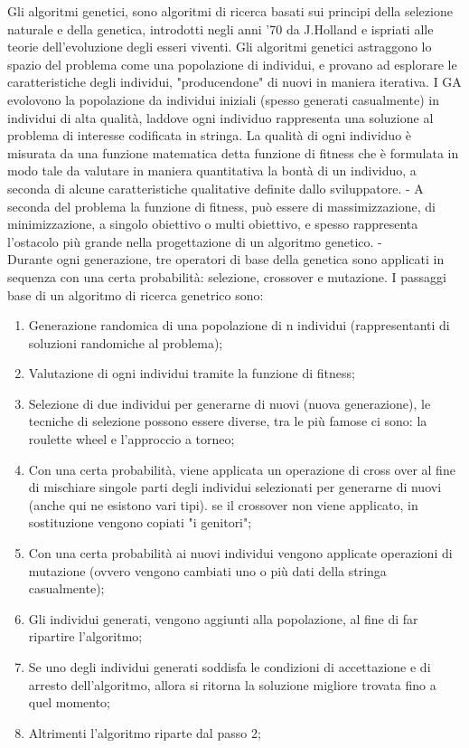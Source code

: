 \cite{geneticalgotihm}Gli algoritmi genetici, sono algoritmi di ricerca basati sui principi della selezione naturale e della genetica, introdotti negli anni '70  da J.Holland e ispriati alle teorie dell'evoluzione degli esseri viventi. Gli algoritmi genetici astraggono lo spazio del problema come una popolazione di individui, e provano ad esplorare le caratteristiche degli individui, "producendone" di nuovi in maniera iterativa. I GA evolovono la popolazione da individui iniziali (spesso generati casualmente) in individui di alta qualità, laddove ogni individuo rappresenta una soluzione al problema di interesse codificata in stringa. La qualità di ogni individuo è misurata da una funzione matematica detta funzione di fitness che è formulata in modo tale da valutare in maniera quantitativa la bontà di un individuo, a seconda di alcune caratteristiche qualitative definite dallo sviluppatore. - A seconda del problema la funzione di fitness, può essere di massimizzazione, di minimizzazione, a singolo obiettivo o multi obiettivo, e spesso rappresenta l'ostacolo più grande nella progettazione di un algoritmo genetico. - \\

\cite{geneticalgotihm} Durante ogni generazione, tre operatori di base della genetica sono applicati in sequenza con una certa probabilità: selezione, crossover e mutazione. I passaggi base di un algoritmo di ricerca genetrico sono:
\begin{enumerate}
    \item Generazione randomica di una popolazione di n individui (rappresentanti di soluzioni randomiche al problema);
    \item Valutazione di ogni individui tramite la funzione di fitness;
    \item Selezione di due individui per generarne di nuovi (nuova generazione), le tecniche di selezione possono essere diverse, tra le più famose ci sono: la roulette wheel e l'approccio a torneo;
    \item Con una certa probabilità, viene applicata un operazione di cross over al fine di mischiare singole parti degli individui selezionati per generarne di nuovi (anche qui ne esistono vari tipi). se il crossover non viene applicato, in sostituzione vengono copiati "i genitori";
    \item Con una certa  probabilità ai nuovi individui vengono applicate operazioni di mutazione (ovvero vengono cambiati uno o più dati della stringa casualmente);
    \item Gli individui generati, vengono aggiunti alla popolazione, al fine di far ripartire l'algoritmo;
    \item Se uno degli individui generati soddisfa le condizioni di accettazione e di arresto dell'algoritmo, allora si ritorna la soluzione migliore trovata fino a quel momento;
    \item Altrimenti l'algoritmo riparte dal passo 2;
    
\end{enumerate}


